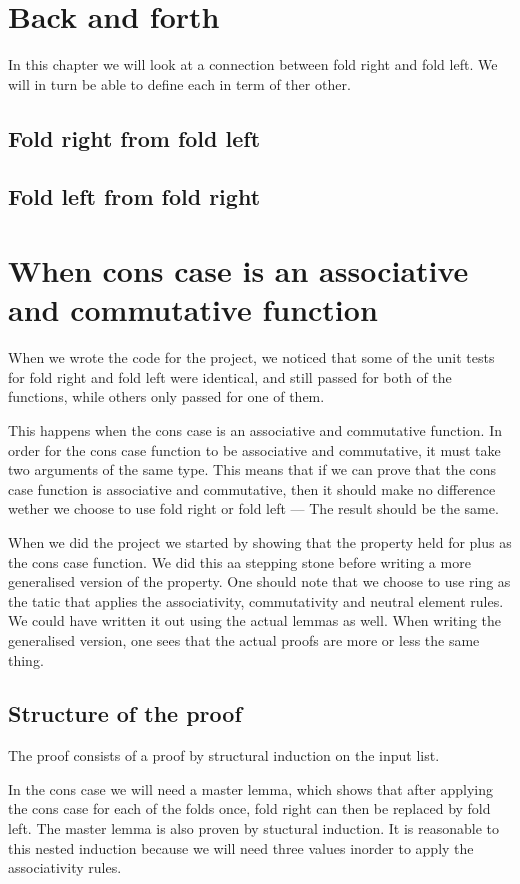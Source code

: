 \documentclass[a4paper]{article}
\begin{document}
\section{Back and forth}
In this chapter we will look at a connection between fold right and fold left.
We will in turn be able to define each in term of ther other.


\subsection{Fold right from fold left}
\subsection{Fold left from fold right}
\section{When cons case is an associative and commutative function}
When we wrote the code for the project, we noticed that some of the unit tests
for fold right and fold left were identical, and still passed for both of the
functions, while others only passed for one of them.

This happens when the cons case is an associative and commutative function.
In order for the cons case function to be associative and commutative, it must
take two arguments of the same type. This means that if we can prove that the
cons case function is associative and commutative, then it should make no
difference wether we choose to use fold right or fold left --- The result should
be the same.

When we did the project we started by showing that the property held for plus as
the cons case function. We did this aa stepping stone before writing a more
generalised version of the property. One should note that we choose to use ring
as the tatic that applies the associativity, commutativity and neutral element
rules. We could have written it out using the actual lemmas as well.
When writing the generalised version, one sees that the actual proofs are more
or less the same thing.

\subsection{Structure of the proof}
The proof consists of a proof by structural induction on the input list.

In the cons case we will need a master lemma, which shows that after applying the cons
case for each of the folds once, fold right can then be replaced by fold left.
The master lemma is also proven by stuctural induction. It is reasonable to this
nested induction because we will need three values inorder to apply the associativity
rules.
\end{document}
